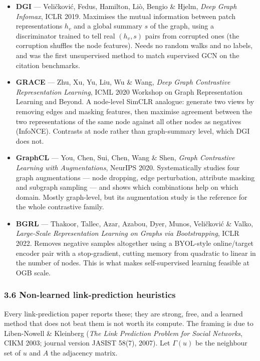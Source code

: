\begin{itemize}[label=$\bullet$,leftmargin=1.3em]
  \item \textbf{DGI} --- Veli\v{c}kovi\'{c}, Fedus, Hamilton, Li\`{o}, Bengio \& Hjelm,
        \emph{Deep Graph Infomax}, ICLR 2019.
        Maximises the mutual information between patch representations $h_v$ and a global
        summary $s$ of the graph, using a discriminator trained to tell real
        $(h_v,s)$ pairs from corrupted ones (the corruption shuffles the node features).
        Needs no random walks and no labels, and was the first unsupervised method to match
        supervised GCN on the citation benchmarks.
  \item \textbf{GRACE} --- Zhu, Xu, Yu, Liu, Wu \& Wang, \emph{Deep Graph Contrastive
        Representation Learning}, ICML 2020 Workshop on Graph Representation Learning and
        Beyond.
        A node-level SimCLR analogue: generate two views by removing edges and masking
        features, then maximise agreement between the two representations of the same node
        against all other nodes as negatives (InfoNCE). Contrasts at node rather than
        graph-summary level, which DGI does not.
  \item \textbf{GraphCL} --- You, Chen, Sui, Chen, Wang \& Shen, \emph{Graph Contrastive
        Learning with Augmentations}, NeurIPS 2020.
        Systematically studies four graph augmentations --- node dropping, edge
        perturbation, attribute masking and subgraph sampling --- and shows which
        combinations help on which domain. Mostly graph-level, but its augmentation study
        is the reference for the whole contrastive family.
  \item \textbf{BGRL} --- Thakoor, Tallec, Azar, Azabou, Dyer, Munos, Veli\v{c}kovi\'{c} \&
        Valko, \emph{Large-Scale Representation Learning on Graphs via Bootstrapping},
        ICLR 2022.
        Removes negative samples altogether using a BYOL-style online/target encoder pair
        with a stop-gradient, cutting memory from quadratic to linear in the number of
        nodes. This is what makes self-supervised learning feasible at OGB scale.
\end{itemize}

\subsubsection*{3.6 Non-learned link-prediction heuristics}

Every link-prediction paper reports these; they are strong, free, and a learned method that
does not beat them is not worth its compute. The framing is due to Liben-Nowell \& Kleinberg
(\emph{The Link Prediction Problem for Social Networks}, CIKM 2003; journal version JASIST
58(7), 2007). Let $\Gamma(u)$ be the neighbour set of $u$ and $A$ the adjacency matrix.

